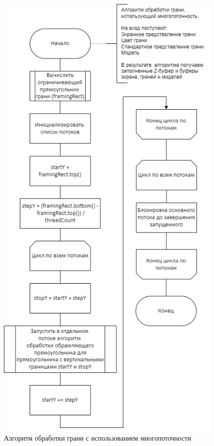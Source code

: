 \begin{figure}[h]
	\centering
	\includegraphics[scale=0.45]{inc/img/face.png}
	\caption{Алгоритм обработки грани с использованием многопоточности}
	\label{fig:face}
\end{figure} 

